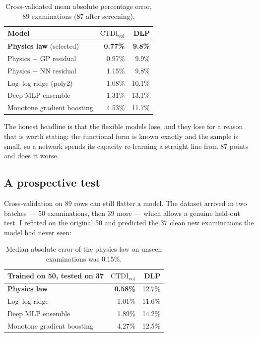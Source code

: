\documentclass[10pt,a4paper,twocolumn]{article}
\newcommand{\ctdi}{\ensuremath{\mathrm{CTDI}_{\mathrm{vol}}}}
\newcommand{\hdr}{\rowcolor{ctsurf}}
\begin{document}
\begin{table}[h]\footnotesize
\begin{tabularx}{\columnwidth}{@{}L r r@{}}
\toprule
\hdr \textbf{Model} & \textbf{\ctdi} & \textbf{DLP}\\
\midrule
{}\textbf{Physics law} (selected) & \textbf{0.77\%} & \textbf{9.8\%}\\
Physics $+$ GP residual & 0.97\% & 9.9\%\\
Physics $+$ NN residual & 1.15\% & 9.8\%\\
Log--log ridge (poly2) & 1.08\% & 10.1\%\\
Deep MLP ensemble & 1.31\% & 13.1\%\\
Monotone gradient boosting & 4.53\% & 11.7\%\\
\bottomrule
\end{tabularx}
\caption{Cross-validated mean absolute percentage error, 89 examinations (87 after screening).}
\end{table}

The honest headline is that the flexible models lose, and they lose for a reason that is worth stating: the
functional form is known exactly and the sample is small, so a network spends its capacity re-learning a
straight line from 87 points and does it worse.

\subsection{A prospective test}

Cross-validation on 89 rows can still flatter a model. The dataset arrived in two batches — 50 examinations,
then 39 more — which allows a genuine held-out test. I refitted on the original 50 and predicted the 37 clean
new examinations the model had never seen:

\begin{table}[h]\footnotesize
\begin{tabularx}{\columnwidth}{@{}L r r@{}}
\toprule
\hdr \textbf{Trained on 50, tested on 37} & \textbf{\ctdi} & \textbf{DLP}\\
\midrule
{}\textbf{Physics law} & \textbf{0.58\%} & 12.7\%\\
Log--log ridge & 1.01\% & 11.6\%\\
Deep MLP ensemble & 1.89\% & 14.2\%\\
Monotone gradient boosting & 4.27\% & 12.5\%\\
\bottomrule
\end{tabularx}
\caption{Median absolute error of the physics law on unseen examinations was 0.15\%.}
\end{table}
\end{document}
